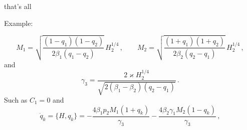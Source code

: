 that's all

Example:

\newcommand\g{{\gamma}}

\[
    M_1=\sqrt{\dfrac{(1-q_1)(1-q_2)}{2\beta_1(q_1-q_2)}}\,H_2^{1/4}\,,\qquad
M_2=\sqrt{\dfrac{(1+q_1)(1+q_2)}{2\beta_2(q_2-q_1)}}\,H_2^{1/4}\,,\]
and
\[
    \g_3=\dfrac{2\varkappa H_2^{1/4}}{\sqrt{2(\beta_1-\beta_2)(q_2-q_1)}}\,.
\]
Such as  $C_1=0$ and
\[
    \dot{q}_k=\{H,q_k\}=-\dfrac{4\beta_1p_2M_1(1+q_k)}{\g_3}-\dfrac{4\beta_2\g_1M_2(1-q_k)}{\g_3}\,,
\]


